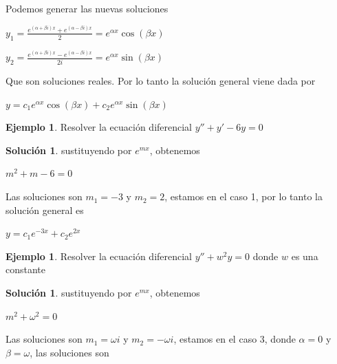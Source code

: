 \documentclass{article}
\theoremstyle{plain}
\theoremstyle{definition}
\newtheorem{ejem}[thm]{Ejemplo}
\newtheorem{sol}[thm]{Solución}
\begin{document}
Podemos generar las nuevas soluciones


\begin{center}
$y_1 = \displaystyle \frac{e^{(\alpha + \beta i)x}+ e^{(\alpha - \beta i)x} }{2} = e^{\alpha x}\cos(\beta x)$
\end{center}

\begin{center}
$y_2 = \displaystyle \frac{e^{(\alpha + \beta i)x}- e^{(\alpha - \beta i)x} }{2i} = e^{\alpha x}\sin(\beta x)$
\end{center}

Que son soluciones reales. Por lo tanto la solución general viene dada por


\begin{center}
$y=c_1e^{\alpha x}\cos(\beta x)+c_2e^{\alpha x}\sin(\beta x)$
\end{center}



\begin{ejem}Resolver la ecuación diferencial $y'' + y' -6y =0$ \\
\end{ejem}

\begin{sol}sustituyendo por $e^{mx}$, obtenemos
\end{sol}

\begin{center}
$m^2+m-6=0$
\end{center}

Las soluciones son $m_1=-3$ y $m_2 = 2$, estamos en el caso 1, por lo tanto la solución general es

\begin{center}
$y= c_1e^{-3x} + c_2e^{2x}$
\end{center}



\begin{ejem}Resolver la ecuación diferencial $y'' + w^2 y=0$ donde $w$ es una constante \\
\end{ejem}

\begin{sol}sustituyendo por $e^{mx}$, obtenemos
\end{sol}

\begin{center}
$m^2+\omega^2=0$
\end{center}

Las soluciones son $m_1= \omega i$ y $m_2 = -\omega i$, estamos en el caso 3, donde $\alpha =0$ y $\beta = \omega$, las soluciones son
\end{document}
